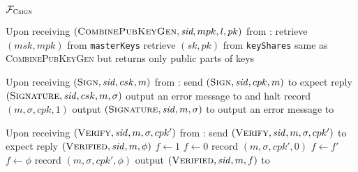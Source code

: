 \begin{systembox}{$\mathcal{F}_{\textsc{Csign}}$}
\begin{algorithmic}[1]
        \State Upon receiving $(\textsc{CombinePubKeyGen}, \textit{sid}, mpk, l,
        pk)$ from \alice:
        \Indent
          \State retrieve $(msk, mpk)$ from \texttt{masterKeys}
          \State retrieve $(sk, pk)$ from \texttt{keyShares}
          \State same as \textsc{CombinePubKeyGen} but returns only public parts
          of keys
        \EndIndent
        \State

        \State Upon receiving $(\textsc{Sign}, \mathit{sid}, csk, m)$ from \alice:
        \Indent
            \State send $(\textsc{Sign}, \mathit{sid}, cpk, m)$ to \adversary
            \State expect reply $(\textsc{Signature}, \mathit{sid}, csk, m,
            \sigma)$
              \State output an error message to \alice{} and halt
            \Else
              \State record $(m, \sigma, cpk, 1)$
              \State output $(\textsc{Signature}, \mathit{sid}, m, \sigma)$ to
              \alice
            \EndIf
          \Else {}
            \State output an error message to \alice{}
          \EndIf
        \EndIndent
        \State

        \State Upon receiving $(\textsc{Verify}, \mathit{sid}, m, \sigma, cpk')$
        from \alice:
        \Indent
          \State send $(\textsc{Verify}, \mathit{sid}, m, \sigma, cpk')$ to
          \adversary
          \State expect reply $(\textsc{Verified}, \mathit{sid}, m, \phi)$
            \State $f \gets 1$
            \State $f \gets 0$
            \State record $(m, \sigma, cpk', 0)$
            \State $f \gets f'$
          \Else
            \State $f \gets \phi$
            \State record $(m, \sigma, cpk', \phi)$
          \EndIf
          \State output $(\textsc{Verified}, \mathit{sid}, m, f)$ to \alice
        \EndIndent
      \end{algorithmic}
    \end{systembox}
